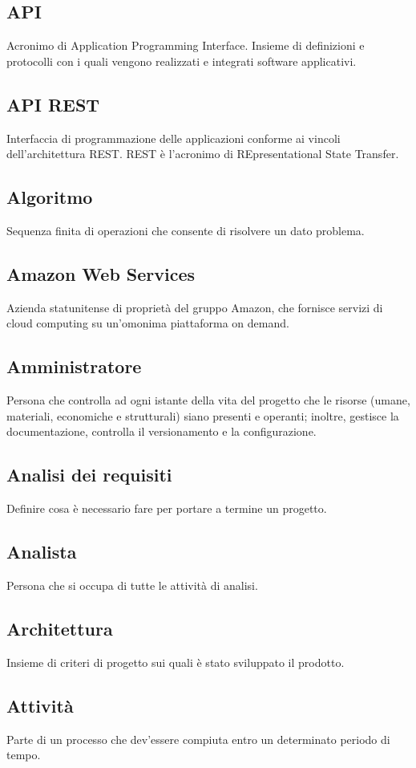 \documentclass[../glossario.tex]{subfiles}
\begin{document}
\subsection*{API}
Acronimo di Application Programming Interface. Insieme di definizioni e protocolli con i quali vengono realizzati e integrati software applicativi.

\subsection*{API REST}
Interfaccia di programmazione delle applicazioni conforme ai vincoli dell'architettura REST. REST è l'acronimo di REpresentational State Transfer.

\subsection*{Algoritmo}
Sequenza finita di operazioni che consente di risolvere un dato problema.

\subsection*{Amazon Web Services}
Azienda statunitense di proprietà del gruppo Amazon, che fornisce servizi di cloud computing su un'omonima piattaforma on demand.

\subsection*{Amministratore}
Persona che controlla ad ogni istante della vita del progetto che le risorse (umane, materiali, economiche e strutturali) siano presenti e operanti; inoltre, gestisce la documentazione, controlla il versionamento e la configurazione.

\subsection*{Analisi dei requisiti}
Definire cosa è necessario fare per portare a termine un progetto.

\subsection*{Analista}
Persona che si occupa di tutte le attività di analisi.

\subsection*{Architettura}
Insieme di criteri di progetto sui quali è stato sviluppato il prodotto.

\subsection*{Attività}
Parte di un processo che dev'essere compiuta entro un determinato periodo di tempo.
\end{document}
